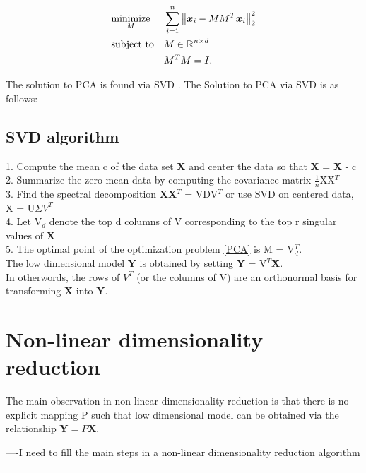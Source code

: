 \begin{equation}\label{PCA}
\begin{aligned}
& \underset{M}{\text{minimize}}
& & \sum_{i=1}^{n} \big \lVert \boldsymbol{x}_{i} - MM^{T}\boldsymbol{x}_{i} \big \rVert_{2}^{2} \\
& \text{subject to}
& & M \in \operatorname{\mathbb{R}}^{n \times d} \\
&&& M^{T}M = I.
\end{aligned}
\end{equation}

The solution  to PCA is found via SVD \cite{BishopChristopherM2006Pram, AmericanMathematicalSociety.1939Apat}. The Solution to PCA via SVD is as follows:

\subsection{SVD algorithm}
1. Compute the mean c of the data set \textbf{X} and center
the data so that \textbf{X} = \textbf{X} - c\\
2. Summarize the zero-mean data by computing the covariance matrix $\frac{1}{n}$XX$^{T}$\\
3. Find the spectral decomposition  \textbf{XX}$^{T}$ = VDV$^{T}$ or 
use SVD on centered data, X = U$\Sigma V^{T}$\\
4. Let V$_{d}$ denote the top d columns of V corresponding to the  top r singular values of \textbf{X}\\
5. The optimal point of the optimization problem \eqref{PCA} is M = V$_{d}^{T}$.\\
The low dimensional model \textbf{Y} is obtained by setting \textbf{Y} = V$^{T}$\textbf{X}.\\
In otherwords, the rows of $V^{T}$ (or the columns of V) are an orthonormal basis for transforming \textbf{X} into \textbf{Y}.




\section{Non-linear dimensionality reduction}
The main observation in non-linear dimensionality reduction is that there is no explicit mapping P such that low dimensional model can be obtained via the relationship 
$\textbf{Y} = P\textbf{X}$.

----I need to fill the main steps in a non-linear dimensionality reduction algorithm--------



